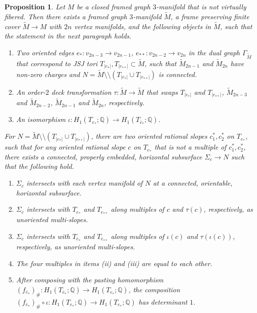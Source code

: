 \documentclass{amsart}
\numberwithin{equation}{section}
\newtheorem{proposition}[theorem]{Proposition}
\theoremstyle{definition}
\begin{document}
\begin{proposition}\label{technicalresult}
Let $M$ be a closed framed graph $3$-manifold that is not virtually fibered. Then there exists a framed graph $3$-manifold $\tilde{M}$, a frame preserving finite cover $\tilde{M}\to M$ with $2n$ vertex manifolds, and the following objects in $\tilde{M}$, such that the statement in the next paragraph holds.
\begin{enumerate}
\item Two oriented edges $e_*:v_{2n-3}\to v_{2n-1}$, $e_{**}:v_{2n-2}\to v_{2n}$ in the dual graph $\Gamma_{\tilde{M}}$ that correspond to JSJ tori $T_{|e_*|},T_{|e_{**}|}\subset \tilde{M}$, such that $\tilde{M}_{2n-1}$ and $\tilde{M}_{2n}$ have non-zero charges and $N=\tilde{M}\setminus\setminus (T_{|e_*|}\cup T_{|e_{**}|})$ is connected.
\item An order-$2$ deck transformation $\tau:\tilde{M}\to \tilde{M}$ that swaps $T_{|e_*|}$ and $T_{|e_{**}|}$, $\tilde{M}_{2n-3}$ and $\tilde{M}_{2n-2}$, $\tilde{M}_{2n-1}$ and $\tilde{M}_{2n}$, respectively.
\item An isomorphism $\iota:H_1(T_{e_*};\mathbb{Q})\to H_1(T_{\bar{e}_*};\mathbb{Q})$.
\end{enumerate}

For $N=\tilde{M}\setminus\setminus (T_{|e_*|}\cup T_{|e_{**}|})$, there are two oriented rational slopes $c_1^*,c_2^*$ on $T_{e_*}$, such that for any oriented rational slope $c$ on $T_{e_*}$ that is not a multiple of $c_1^*,c_2^*$, there exists a connected, properly embedded, horizontal subsurface $\Sigma_c\to N$ such that the following hold.
\begin{enumerate}
\item[(i)] $\Sigma_c$ intersects with each vertex manifold of $N$ at a connected, orientable, horizontal subsurface.
\item[(ii)] $\Sigma_c$ intersects with $T_{e_*}$ and $T_{e_{**}}$ along multiples of $c$ and $\tau(c)$, respectively, as unoriented multi-slopes.
\item[(iii)] $\Sigma_c$ intersects with $T_{\bar{e}_*}$ and $T_{\bar{e}_{**}}$ along multiples of $\iota(c)$ and $\tau(\iota(c))$, respectively, as unoriented multi-slopes.
\item[(iv)] The four multiples in items (ii) and (iii) are equal to each other.
\item[(v)] After composing with the pasting homomorphism $(f_{\bar{e}_*})_{\#}:H_1(T_{\bar{e}_*};\mathbb{Q})\to H_1(T_{e_*};\mathbb{Q})$, the composition $(f_{\bar{e}_*})_{\#}\circ\iota: H_1(T_{e_*};\mathbb{Q})\to H_1(T_{e_*};\mathbb{Q})$ has determinant $1$.
\end{enumerate}
\end{proposition}
\end{document}
